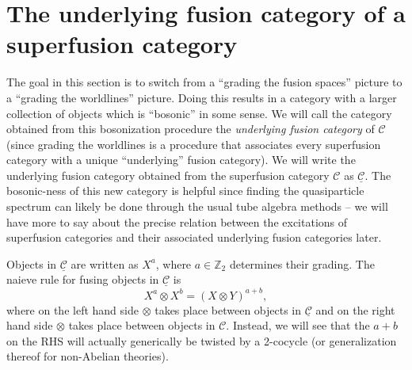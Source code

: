 \documentclass[12pt,a4paper]{article}
\newcommand{\tp}{\otimes}
\newcommand{\ulmcc}{\underline{\mathcal{C}}}
\newcommand{\zt}{\mathbb{Z}_2}
\newcommand\be            {\begin{equation}}
\newcommand\ee            {\end{equation}}
\newcommand{\mcc}{\mathcal{C}}
\newcommand{\id}{\text{id}}
\newcommand{\End}{\text{End}}
\newcommand{\cl}{\mathbb{C}\ell}
\begin{document}


\section{The underlying fusion category of a superfusion category}
\label{FindingFusionRules}

The goal in this section is to switch from a ``grading the fusion spaces'' picture to a ``grading the worldlines'' picture. Doing this results in a category with a larger collection of objects which is ``bosonic'' in some sense. We will call the category obtained from this bosonization procedure the {\it underlying fusion category} of $\mcc$ (since grading the worldlines is a procedure that associates every superfusion category with a unique ``underlying'' fusion category). We will write the underlying fusion category obtained from the superfusion category $\mcc$ as $\ulmcc$. The bosonic-ness of this new category is helpful since finding the quasiparticle spectrum can likely be done through the usual tube algebra methods -- we will have more to say about the precise relation between the excitations of superfusion categories and their associated underlying fusion categories later. 

Objects in $\ulmcc$ are written as $X^a$, where $a\in\zt$ determines their grading. The naieve rule for fusing objects in $\ulmcc$ is
\be X^a \tp X^b = (X\tp Y)^{a+b},\ee
where on the left hand side $\tp$ takes place between objects in $\ulmcc$ and on the right hand side $\tp$ takes place between objects in $\mcc$. Instead, we will see that the $a+b$ on the RHS will actually generically be twisted by a 2-cocycle (or generalization thereof for non-Abelian theories). 
\end{document}
